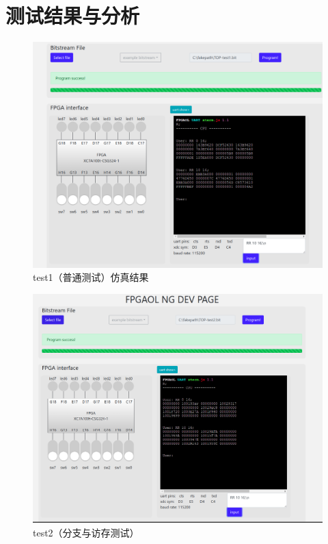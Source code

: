 \documentclass[12pt,a4paper]{ctexart}
\begin{document}
\section{测试结果与分析}
\begin{figure}[H]
    \centering
    \includegraphics[scale=0.5]{pic/test1.png}
    \caption{test1（普通测试）仿真结果}
\end{figure}
\begin{figure}[H]
    \centering
    \includegraphics[scale=0.5]{pic/test2.png}
    \caption{test2（分支与访存测试）}
\end{figure}
\end{document}
